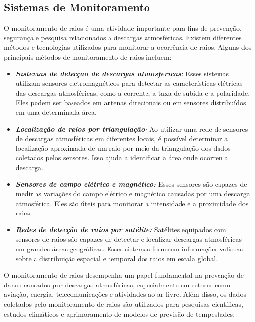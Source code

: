 \documentclass[a4paper, 12pt, onecolumn,singlespacing]{article}
\begin{document}
	\subsection{Sistemas de Monitoramento}
		O monitoramento de raios é uma atividade importante para fins de prevenção, segurança e pesquisa relacionados a descargas atmosféricas. Existem diferentes métodos e tecnologias utilizados para monitorar a ocorrência de raios. Alguns dos principais métodos de monitoramento de raios incluem:
	
		\begin{itemize}
			\item \textbf{\textit{Sistemas de detecção de descargas atmosféricas:}} Esses sistemas utilizam sensores eletromagnéticos para detectar as características elétricas das descargas atmosféricas, como a corrente, a taxa de subida e a polaridade. Eles podem ser baseados em antenas direcionais ou em sensores distribuídos em uma determinada área.
			
			\item \textbf{\textit{Localização de raios por triangulação:}} Ao utilizar uma rede de sensores de descargas atmosféricas em diferentes locais, é possível determinar a localização aproximada de um raio por meio da triangulação dos dados coletados pelos sensores. Isso ajuda a identificar a área onde ocorreu a descarga.
			
			\item \textbf{\textit{Sensores de campo elétrico e magnético:}} Esses sensores são capazes de medir as variações do campo elétrico e magnético causadas por uma descarga atmosférica. Eles são úteis para monitorar a intensidade e a proximidade dos raios.
			
			\item \textbf{\textit{Redes de detecção de raios por satélite:}} Satélites equipados com sensores de raios são capazes de detectar e localizar descargas atmosféricas em grandes áreas geográficas. Esses sistemas fornecem informações valiosas sobre a distribuição espacial e temporal dos raios em escala global.
		\end{itemize}
		
		O monitoramento de raios desempenha um papel fundamental na prevenção de danos causados por descargas atmosféricas, especialmente em setores como aviação, energia, telecomunicações e atividades ao ar livre. Além disso, os dados coletados pelo monitoramento de raios são utilizados para pesquisas científicas, estudos climáticos e aprimoramento de modelos de previsão de tempestades.
		
\end{document}
